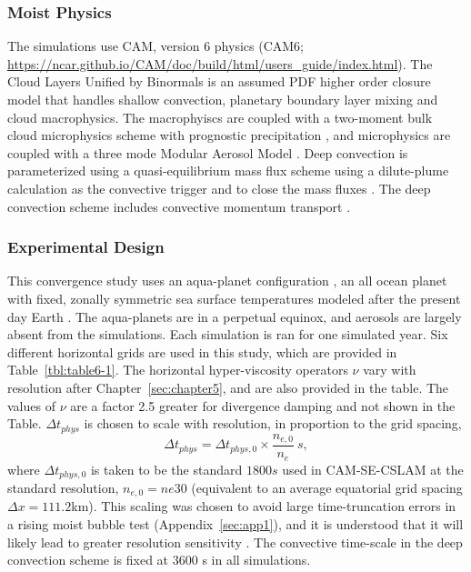 \subsubsection{Moist Physics}

The simulations use CAM, version 6 physics (CAM6; \url{https://ncar.github.io/CAM/doc/build/html/users_guide/index.html}). The Cloud Layers Unified by Binormals \citep[CLUBB][]{GETAL2002JAS,BOG2013JCLIM} is an assumed PDF higher order closure model that handles shallow convection, planetary boundary layer mixing and cloud macrophysics. The macrophyiscs are coupled with a two-moment bulk cloud microphysics scheme with prognostic precipitation \citep{MG2}, and microphysics are coupled with a three mode Modular Aerosol Model \citep{MAM}. Deep convection is parameterized using a quasi-equilibrium mass flux scheme \citep{ZM1995AO} using a dilute-plume calculation as the convective trigger and to close the mass fluxes \citep{NRJ2008JC}. The deep convection scheme includes convective momentum transport \citep{RR2008JC}.

\subsubsection{Experimental Design}
 
This convergence study uses an aqua-planet configuration \citep{NH2000ASL,MWO2016JAMES}, an all ocean planet with fixed, zonally symmetric sea surface temperatures modeled after the present day Earth \citep[$QOBS$ in][]{NH2000ASL}. The aqua-planets are in a perpetual equinox, and aerosols are largely absent from the simulations. Each simulation is ran for one simulated year. Six different horizontal grids are used in this study, which are provided in Table~\ref{tbl:table6-1}. The horizontal hyper-viscosity operators $\nu$ vary with resolution after Chapter~\ref{sec:chapter5}, and are also provided in the table. The values of $\nu$ are a factor 2.5 greater for divergence damping and not shown in the Table. $\Delta t_{phys}$ is chosen to scale with resolution, in proportion to the grid spacing,
\begin{equation}
\Delta t_{phys} = \Delta t_{phys,0} \times \frac{n_{e,0}}{n_e}~s,\label{eq:dt-scale}
\end{equation}
where $\Delta t_{phys,0}$ is taken to be the standard $1800 s$ used in CAM-SE-CSLAM at the standard resolution, $n_{e,0} = ne30$ (equivalent to an average equatorial grid spacing $\Delta x = 111.2$km). This scaling was chosen to avoid large time-truncation errors in a rising moist bubble test (Appendix~\ref{sec:app1}), and it is understood that it will likely lead to greater resolution sensitivity \citep{W2008TELLUS,HR2018JAMES}. The convective time-scale in the deep convection scheme is fixed at 3600 s in all simulations.
 
